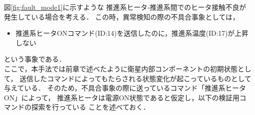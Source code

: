 \documentclass[11pt]{jsreport}
\begin{document}
図\ref{fig:fault_mode1}に示すような
推進系ヒータ‐推進系間でのヒータ接触不良が発生している場合を考える．
この時，異常検知の際の不具合事象としては，
\begin{itemize}
   \item 推進系ヒータONコマンド(ID:14)を送信したのに，推進系温度(ID:17)が上昇しない
\end{itemize}
という事象である．\\
ここで，本手法では前章で述べたように衛星内部コンポーネントの初期状態として，
送信したコマンドによってもたらされる状態変化が起こっているものとして与えている．
そのため，不具合事象の際に送っているコマンド「推進系ヒータON」によって，
推進系ヒータは電源ON状態であると仮定し，以下の検証用コマンドの探索を行っている
ことを述べておく．
\end{document}
